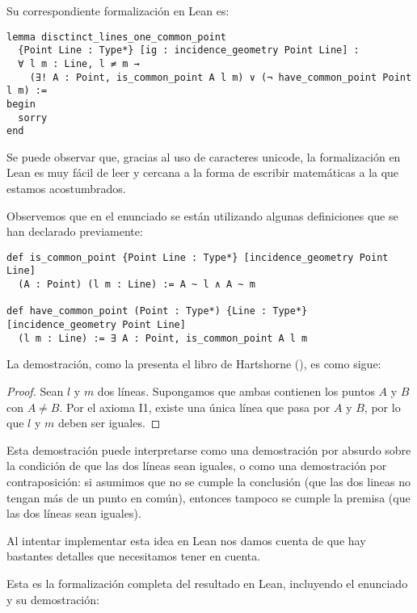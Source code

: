 Su correspondiente formalización en Lean es:


\begin{lstlisting}
lemma disctinct_lines_one_common_point 
  {Point Line : Type*} [ig : incidence_geometry Point Line] :
  ∀ l m : Line, l ≠ m → 
    (∃! A : Point, is_common_point A l m) ∨ (¬ have_common_point Point l m) := 
begin
  sorry
end
\end{lstlisting}


Se puede observar que, gracias al uso de caracteres unicode, la formalización en
Lean es muy fácil de leer y cercana a la forma de escribir matemáticas a la que
estamos acostumbrados.


Observemos que en el enunciado se están utilizando algunas definiciones que se
han declarado previamente:

\begin{lstlisting}
def is_common_point {Point Line : Type*} [incidence_geometry Point Line] 
  (A : Point) (l m : Line) := A ~ l ∧ A ~ m 

def have_common_point (Point : Type*) {Line : Type*} [incidence_geometry Point Line]
  (l m : Line) := ∃ A : Point, is_common_point A l m
\end{lstlisting}


La demostración, como la presenta el libro de Hartshorne (), es como
sigue:
\begin{proof}
    Sean $l$ y $m$ dos líneas. Supongamos que ambas contienen los puntos $A$ y
    $B$ con $A\ne B$. Por el axioma I1, existe una única línea que pasa por $A$
    y $B$, por lo que $l$ y $m$ deben ser iguales.
\end{proof}

Esta demostración puede interpretarse como una demostración por absurdo sobre la
condición de que las dos líneas sean iguales, o como una demostración por
contraposición: si asumimos que no se cumple la conclusión (que las dos lineas
no tengan más de un punto en común), entonces tampoco se cumple la premisa (que las
dos líneas sean iguales).

Al intentar implementar esta idea en Lean nos damos cuenta de que hay bastantes
detalles que necesitamos tener en cuenta.

Esta es la formalización completa del resultado en Lean, incluyendo el enunciado
y su demostración:

